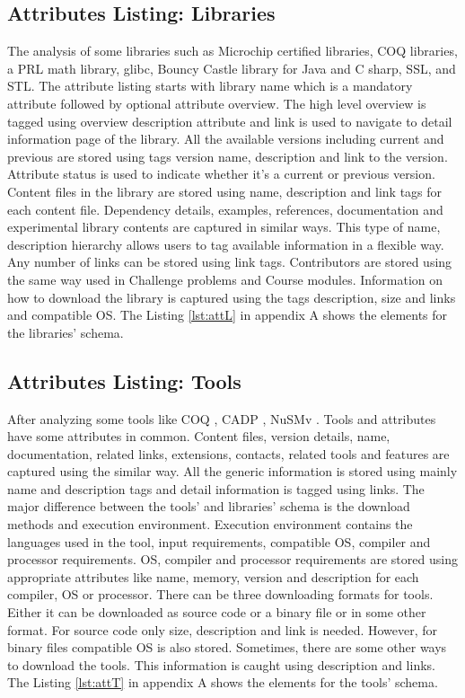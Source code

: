 \documentclass[11pt,letterpaper]{report}
\begin{document}
\subsection{Attributes Listing: Libraries}
The analysis of some libraries such as Microchip certified libraries, COQ libraries, a PRL math library, glibc, Bouncy Castle library for Java and C sharp, SSL, and STL. The attribute listing starts with library name which is a mandatory attribute followed by optional attribute overview. The high level overview is tagged using overview description attribute and link is used to navigate to detail information page of the library. All the available versions including current and previous are stored using tags version name, description and link to the version. Attribute status is used to indicate whether it's a current or previous version. Content files in the library are stored using name, description and link tags for each content file. Dependency details, examples, references, documentation and experimental library contents are captured in similar ways. This type of name, description hierarchy allows users to tag available information in a flexible way. Any number of links can be stored using link tags. Contributors are stored using the same way used in Challenge problems and Course modules. Information on how to download the library is captured using the tags description, size and links and compatible OS. The Listing \ref{lst:attL} in appendix A shows the elements for the libraries' schema.

\subsection{Attributes Listing: Tools}
After analyzing some tools like COQ \cite{COQ}, CADP \cite{CADP}, NuSMv \cite{NUSMV}. Tools and attributes have some attributes in common. Content files, version details, name, documentation, related links, extensions, contacts, related tools and features are captured using the similar way. All the generic information is stored using mainly name and description tags and detail information is tagged using links. The major difference between the tools' and libraries' schema is the download methods and execution environment. Execution environment contains the languages used in the tool, input requirements, compatible OS, compiler and processor requirements. OS, compiler and processor requirements are stored using appropriate attributes like name, memory, version and description for each compiler, OS or processor. There can be three downloading formats for tools. Either it can be downloaded as source code or a binary file or in some other format. For source code only size, description and link is needed. However, for binary files compatible OS is also stored. Sometimes, there are some other ways to download the tools. This information is caught using description and links. The Listing \ref{lst:attT} in appendix A shows the elements for the tools' schema.
 
\end{document}
